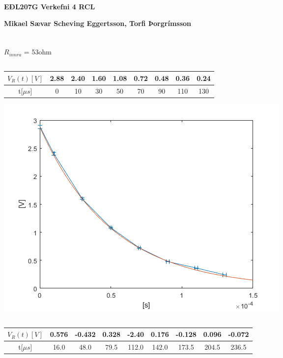 \documentclass[12pt]{article}
\begin{document}
\centerline{\bf \Huge EÐL207G Verkefni 4 RCL}
\centerline{\bf Mikael Sævar Scheving Eggertsson, Torfi Þorgrímsson}

\centerline{\bf \large }

\tableofcontents
\newpage
\section{}
\subsection{}

$R_{innra}$ = 53ohm

\subsection{}
\begin{table}[H]
    \begin{tabular}{|c|c|c|c|c|c|c|c|c|}
    \hline
    $V_R(t) [V]$  & 2.88 & 2.40 & 1.60 & 1.08 & 0.72 & 0.48 & 0.36 & 0.24  \\
    \hline
    t[$\mu s$] & 0 & 10 & 30 & 50 & 70 & 90 & 110 & 130  \\
    \hline
    \end{tabular}
\end{table}
 
\includegraphics[scale=0.7]{data_01}

\subsection{}
\begin{table}[H]
    \begin{tabular}{|c|c|c|c|c|c|c|c|c|}
    \hline
    $V_R(t) [V]$  & 0.576 & -0.432 & 0.328 & -2.40 & 0.176 & -0.128 & 0.096 & -0.072 \\
    \hline
    t[$\mu s$]    & 16.0 & 48.0 & 79.5 & 112.0 & 142.0 & 173.5 & 204.5 & 236.5 \\
    \hline
    \end{tabular}
\end{table}
\end{document}
